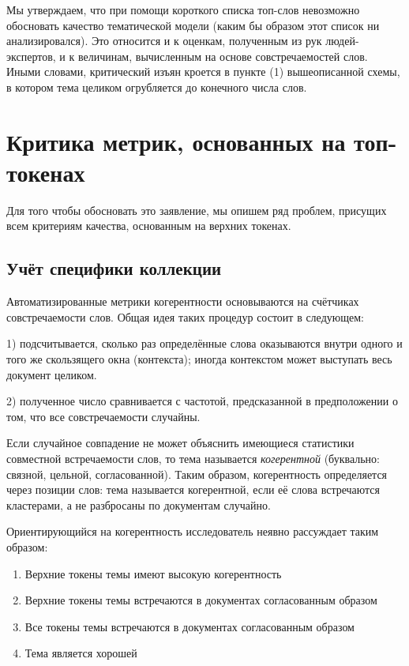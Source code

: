 Мы утверждаем, что при помощи короткого списка топ-слов невозможно обосновать качество тематической модели (каким бы образом этот список ни анализировался). Это относится и к оценкам, полученным из рук людей-экспертов, и к величинам, вычисленным на основе совстречаемостей слов. Иными словами, критический изъян кроется в пункте (1) вышеописанной схемы, в котором тема целиком огрубляется до конечного числа слов.

\section{Критика метрик, основанных на топ-токенах}


Для того чтобы обосновать это заявление, мы опишем ряд проблем, присущих всем критериям качества, основанным на верхних токенах.

\subsection{Учёт специфики коллекции}

Автоматизированные метрики когерентности основываются на счётчиках совстречаемости слов. Общая идея таких процедур состоит в следующем:

1) подсчитывается, сколько раз определённые слова оказываются внутри одного и того же скользящего окна (контекста); иногда контекстом может выступать весь документ целиком.

2) полученное число сравнивается с частотой, предсказанной в предположении о том, что все совстречаемости случайны.

Если случайное совпадение не может объяснить имеющиеся статистики совместной встречаемости слов, то тема называется \textit{когерентной} (буквально: связной, цельной, согласованной). Таким образом, когерентность определяется через позиции слов: тема называется когерентной, если её слова встречаются кластерами, а не разбросаны по документам случайно.

Ориентирующийся на когерентность исследователь неявно рассуждает таким образом:
\begin{enumerate}
    \item Верхние токены темы имеют высокую когерентность
    \item Верхние токены темы встречаются в документах согласованным образом
    \item Все токены темы встречаются в документах согласованным образом
    \item Тема является хорошей
\end{enumerate}

